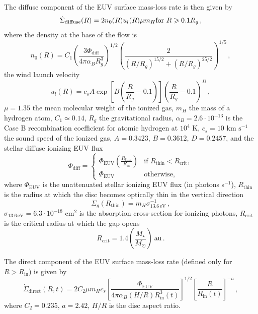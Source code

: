 \documentclass[fleqn,usenatbib,letters]{mnras}
\begin{document}
The diffuse component of the EUV surface mass-loss rate is then given by
\begin{equation}
    \dot{\Sigma}_\mathrm{diffuse}(R) = 2n_0(R)u_l(R)\mu m_H \\ \mathrm{for }\ R\geq 0.1 R_g\,,
\end{equation}
where the density at the base of the flow is
\begin{equation}
    n_0(R) = C_1 \left(\frac{3\Phi_\mathrm{diff}}{4\pi\alpha_B R_g^3}\right)^{1/2} \left(\frac{2}{(R/R_g)^{15/2}+(R/R_g)^{25/2}}\right)^{1/5} \,,
\end{equation}
the wind launch velocity 
\begin{equation}
    u_l(R) = c_s A \exp{\left[B\left(\frac{R}{R_g} - 0.1\right)\right]} \left(\frac{R}{R_g} - 0.1\right)^D \,,
\end{equation}
$\mu = 1.35$ the mean molecular weight of the ionized gas, $m_H$ the mass of a hydrogen atom, $C_1 \simeq 0.14$, $R_g$ the gravitational radius, $\alpha_B = 2.6\cdot10^{-13}$ is the Case B recombination coefficient for atomic hydrogen at $10^4$ K, $c_s = 10$ km $\mathrm{s}^{-1}$ the sound speed of the ionized gas, $A=0.3423$, $B=0.3612$, $D=0.2457$, and the stellar diffuse ionizing EUV flux
\begin{equation}
    \Phi_\mathrm{diff} = 
    \begin{cases}
        \Phi_\mathrm{EUV}\left(\frac{R_\mathrm{thin}}{R_\mathrm{in}}\right) & \text{if } R_\mathrm{thin} < R_\mathrm{crit},\\
        \Phi_\mathrm{EUV} & \text{otherwise},
    \end{cases}
\end{equation}
where $\Phi_\mathrm{EUV}$ is the unattenuated stellar ionizing EUV flux (in photons s$^{-1}$), $R_\mathrm{thin}$ is the radius at which the disc becomes optically thin in the vertical direction
\begin{equation}
    \Sigma_g(R_\mathrm{thin}) = m_H \sigma_\mathrm{13.6\, eV}^{-1} \,,
\end{equation}
$\sigma_\mathrm{13.6\, eV} = 6.3\cdot10^{-18}$ cm$^2$ is the absorption cross-section for ionizing photons, $R_\mathrm{crit}$ is the critical radius at which the gap opens
\begin{equation}
    R_\mathrm{crit} = 1.4 \left(\frac{M_\star}{M_\odot}\right) \ \text{au}\,.
\end{equation}

The direct component of the EUV surface mass-loss rate (defined only for $R>R_\mathrm{in}$) is given by
\begin{equation}
    \dot{\Sigma}_\mathrm{direct}(R, t) = 2 C_2 \mu m_H c_s \left[\frac{\Phi_\mathrm{EUV}}{4\pi\alpha_B(H/R) R_\mathrm{in}^3(t)}\right]^{1/2} \left[\frac{R}{R_\mathrm{in}(t)}\right]^{-a} \,,
\end{equation}
where $C_2 = 0.235$, $a = 2.42$, $H/R$ is the disc aspect ratio.
\end{document}
